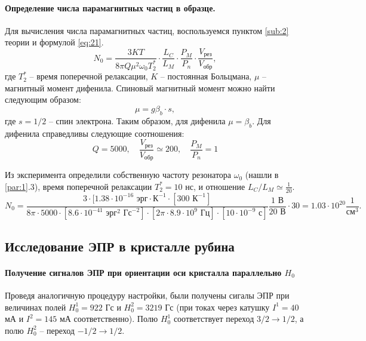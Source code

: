 \paragraph{Определение числа парамагнитных частиц в образце.}%
Для вычисления числа парамагнитных частиц, воспользуемся пунктом \ref{sub:2} теории и формулой \eqref{eq:21}.
\begin{equation}
    \label{eq:21a}
    N_0 = \frac{3KT}{8 \pi Q \mu^2 \omega_0 T^*_2} \cdot \frac{L_C}{L_M} \cdot \frac{P_M}{P_n} \cdot \frac{V_{\text{рез}}}{V_{\text{обр}}},
\end{equation}
где $T_2^*$ -- время поперечной релаксации,  $K$ -- постоянная Больцмана,  $\mu$ -- магнитный момент дифенила.
Спиновый магнитный момент можно найти следующим образом:
\begin{equation}
    \mu = g \beta_b \cdot s,
\end{equation}
где $s=1 / 2$ -- спин электрона. 
Таким образом, для дифенила  $\mu = \beta_b$.
Для дифенила справедливы следующие соотношения:
\begin{equation}
    \label{eq:}
    Q = 5000, \quad \frac{V_{\text{рез}}}{V_{\text{обр}}} \simeq 200, \quad \frac{P_M}{P_n} = 1
\end{equation}

Из эксперимента определили собственную частоту резонатора $\omega_{0}$ (нашли в \ref{par:1}.3), время
поперечной релаксации $T^*_2 = 10$ нс, и отношение  $L_C / L_M \simeq \frac{1}{20}$. 
\begin{equation}
    N_0 =  \frac{3\cdot[1.38 \cdot 10^{-16} \text{ эрг}\cdot\text{К}^{-1}
    \cdot [300 \text{ К}^{-1}]}{8\pi \cdot 5000\cdot[8.6\cdot 10^{-41} \text{ эрг}^2 \text{ Гс}^{-2}]
\cdot [2\pi \cdot 8.9 \cdot 10^9 \text{ Гц}] \cdot [10\cdot 10^{-9} \text{ с}] }
\frac{1 \text{ В}}{20 \text{ В}} \cdot 30  = 1.03 \cdot 10^{20} \frac{1}{\text{см}^3}.
\end{equation}
\subsection{Исследование ЭПР в кристалле рубина}%
\paragraph{Получение сигналов ЭПР при ориентации оси кристалла параллельно $H_0$}

Проведя аналогичную процедуру настройки, были получены сигалы ЭПР при величинах полей $H_0^1 = 922$ Гс и $H_0^2 = 3219$ Гс
(при токах через катушку $I^1 = 40$ мА и $I^2 = 145$ мА соответственно). Полю $H_0^1$ соответствует переход
$3/2\rightarrow 1/2$, а полю $H_0^2$ -- переход $-1/2\rightarrow 1/2$.

